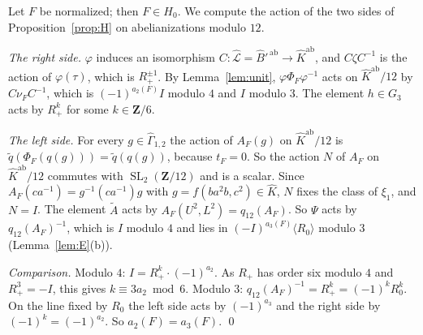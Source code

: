 \documentclass[11pt,a4paper]{article}
\theoremstyle{plain}
\theoremstyle{definition}
\theoremstyle{remark}
\newcommand{\Z}{\mathbf Z}
\newcommand{\Bh}{\widehat B}
\newcommand{\Gh}{\widehat\Gamma}
\newcommand{\SL}{\operatorname{SL}}
\newcommand{\ab}{\mathrm{ab}}
\begin{document}
Let $F$ be normalized; then $F\in H_0$. We compute the action of the two sides of Proposition~\ref{prop:H} on
abelianizations modulo $12$.

\emph{The right side.} $\varphi$ induces an isomorphism $C:\widehat{\mathcal L}=\Bh'^{\,\ab}\to\widehat K^{\ab}$, and
$C\zeta C^{-1}$ is the action of $\varphi(\tau)$, which is $R_+^{\pm1}$. By Lemma~\ref{lem:unit},
$\varphi\Phi_F\varphi^{-1}$ acts on $\widehat K^{\ab}/12$ by $C\nu_FC^{-1}$, which is $(-1)^{a_2(F)}I$ modulo $4$ and
$I$ modulo $3$. The element $h\in G_3$ acts by $R_+^k$ for some $k\in\Z/6$.

\emph{The left side.} For every $g\in\Gh_{1,2}$ the action of $A_F(g)$ on $\widehat K^{\ab}/12$ is
$\tilde q(\Phi_F(q(g)))=\tilde q(q(g))$, because $t_F=0$. So the action $N$ of $A_F$ on $\widehat K^{\ab}/12$
commutes with $\SL_2(\Z/12)$ and is a scalar. Since $A_F(ca^{-1})=g^{-1}(ca^{-1})g$ with
$g=f(ba^2b,c^2)\in\widehat K$, $N$ fixes the class of $\xi_1$, and $N=I$. The element $\tilde A$ acts by
$A_F(U^2,L^2)=q_{12}(A_F)$. So $\Psi$ acts by $q_{12}(A_F)^{-1}$, which is $I$ modulo $4$ and lies in
$(-I)^{a_3(F)}\langle R_0\rangle$ modulo $3$ (Lemma~\ref{lem:E}(b)).

\emph{Comparison.} Modulo $4$: $I=R_+^k\cdot(-1)^{a_2}$. As $R_+$ has order six modulo $4$ and $R_+^3=-I$, this
gives $k\equiv3a_2\bmod6$. Modulo $3$: $q_{12}(A_F)^{-1}=R_+^k=(-1)^kR_0^k$. On the line fixed by $R_0$ the left
side acts by $(-1)^{a_3}$ and the right side by $(-1)^k=(-1)^{a_2}$. So $a_2(F)=a_3(F)$. \qed
\end{document}
